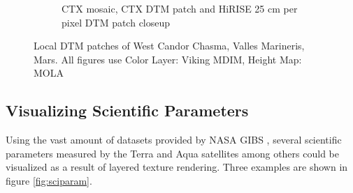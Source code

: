 \begin{figure}[h]
\begin{subfigure}[t]{0.90\textwidth}
        \caption{CTX mosaic, CTX DTM patch and HiRISE 25 cm per pixel DTM patch closeup}
    \end{subfigure}
    \caption{Local DTM patches of West Candor Chasma, Valles Marineris, Mars. All figures use Color Layer: Viking MDIM, Height Map: MOLA}
    \label{fig:localpatches}
\end{figure}


\clearpage
\subsection{Visualizing Scientific Parameters}
\FloatBarrier

Using the vast amount of datasets provided by NASA GIBS \cite{gibs}, several scientific parameters measured by the Terra and Aqua satellites among others could be visualized as a result of layered texture rendering. Three examples are shown in figure \ref{fig:sciparam}.

